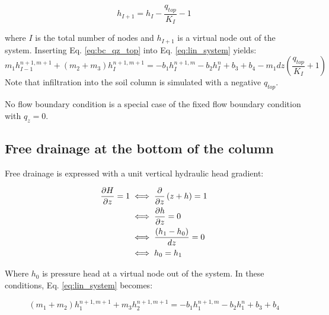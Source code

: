 \documentclass[a4paper,12pt]{article}
\begin{document}
\begin{equation} \label{eq:bc_qz_top}
    h_{I+1}  = h_I  - \frac{q_{top}}{K_I} - 1
\end{equation}

where $I$ is the total number of nodes and $h_{I+1}$ is a virtual node out of the system. Inserting Eq. \ref{eq:bc_qz_top} into Eq. \ref{eq:lin_system} yields: 
\begin{equation} \label{eq:bc_qz_lin_system_top}
    m_1 h_{I-1}^{n+1,m+1} + (m_2 + m_3) h_I^{n+1,m+1} = - b_1 h_I^{n+1,m} - b_2 h_I^n + b_3 + b_4 - m_1 dz \left( \frac{q_{top}}{K_I} +1 \right)
\end{equation}
Note that infiltration into the soil column is simulated with a negative $q_{top}$.


No flow boundary condition is a special case of the fixed flow boundary condition with $q_z = 0$.


\subsection{Free drainage at the bottom of the column}

Free drainage is expressed with a unit vertical hydraulic head gradient: 

\begin{align} \label{eq:bc_drain}
    \frac{\partial H}{\partial z} = 1 &\iff \frac{\partial}{\partial z} \left( z + h \right) =1 \nonumber \\
				      &\iff \frac{\partial h}{\partial z} = 0 \nonumber \\
				      &\iff {\left( h_1 - h_0 \right) \over dz}  = 0 \nonumber \\
				      &\iff h_0 = h_1 
\end{align}

Where $h_0$ is pressure head at a virtual node out of the system. In these conditions, Eq. \ref{eq:lin_system} becomes:

\begin{equation} \label{eq:bc_drain_sys}
    (m_1 + m_2) h_1^{n+1,m+1} + m_3 h_2^{n+1,m+1} = - b_1 h_1^{n+1,m} - b_2 h_1^n + b_3 + b_4
\end{equation}
\end{document}
